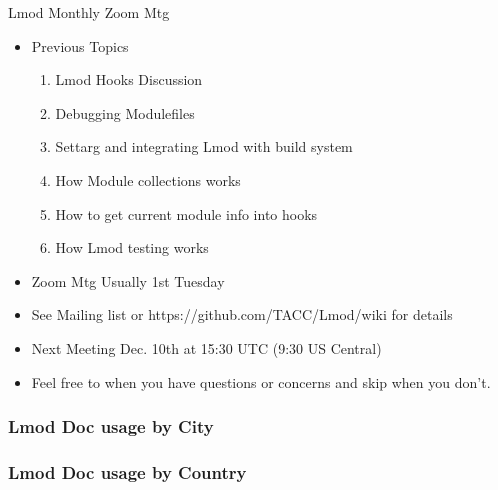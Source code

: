 \documentclass{beamer}
\begin{document}
\begin{frame}{Lmod Monthly Zoom Mtg}
  \begin{itemize}
    \item Previous Topics
      \begin{enumerate}
        \item Lmod Hooks Discussion
        \item Debugging Modulefiles
        \item Settarg and integrating Lmod with build system
        \item How Module collections works 
        \item How to get current module info into hooks
        \item How Lmod testing works
      \end{enumerate}
    \item Zoom Mtg Usually 1st Tuesday 
    \item See Mailing list or https://github.com/TACC/Lmod/wiki for
      details
    \item Next Meeting Dec. 10th at 15:30 UTC (9:30 US Central)
    \item Feel free to when you have questions or concerns and skip
      when you don't.
  \end{itemize}
\end{frame}

\begin{frame}[fragile]
    \frametitle{Lmod Doc usage by City}
\end{frame}

\begin{frame}[fragile]
    \frametitle{Lmod Doc usage by Country}
\end{frame}
\end{document}
